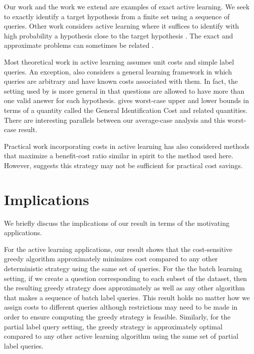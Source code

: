 \documentclass{article}
\begin{document}
Our work and the work we extend are examples of exact active learning.
We seek to exactly identify a target hypothesis from a finite set
using a sequence of queries.  Other work considers active learning
where it suffices to identify with high probability a hypothesis close
to the target hypothesis \citep{generalagnostic, importance}.  The exact and
approximate problems can sometimes be related \citep{teaching}.

Most theoretical work in active learning assumes unit costs and simple
label queries.  An exception, \citet{costcomp}
also considers a general learning framework in
which queries are arbitrary and have known costs associated with them.
In fact, the setting used by \citet{costcomp} is more general in that 
questions are allowed to have more than one valid answer for each
hypothesis.  \citet{costcomp} gives worst-case upper and lower bounds in
terms of a quantity called the General Identification Cost and related
quantities.  There are interesting parallels between our average-case
analysis and this worst-case result.

Practical work incorporating costs in active learning 
\citep{activereal, activeroi} has also considered methods
that maximize a benefit-cost ratio similar in spirit to the
method used here.  However, \citet{activereal} suggests
this strategy may not be sufficient for practical cost savings.

\section{Implications}

We briefly discuss the implications of our result in terms of the
motivating applications.  

For the active learning applications, our result shows that the
cost-sensitive greedy algorithm approximately minimizes cost compared
to any other deterministic strategy using the same set of queries.
For the the batch learning setting, if we create a question corresponding
to each subset of the dataset, then the resulting greedy strategy does
approximately as well as any other algorithm that makes a sequence of
batch label queries.  This result holds no matter how we assign costs
to different queries although restrictions may need to be made in
order to ensure computing the greedy strategy is feasible.  Similarly,
for the partial label query setting, the greedy strategy is
approximately optimal compared to any other active learning algorithm
using the same set of partial label queries. 
\end{document}

